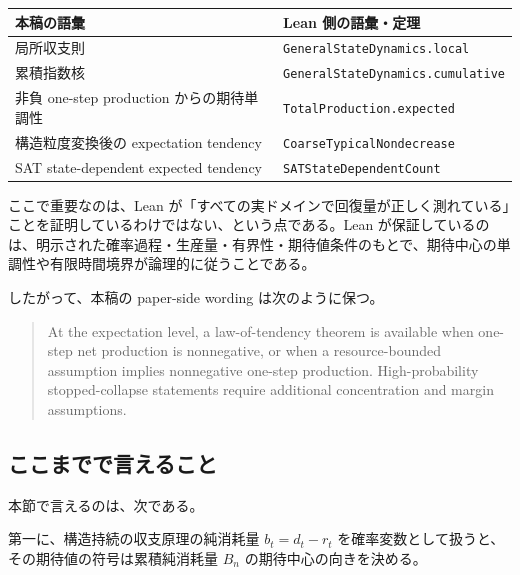 \documentclass[12pt,a4paper]{article}
\begin{document}
{\def\LTcaptype{table} %
\begin{longtable}[]{@{}
  >{\raggedright\arraybackslash}p{}
  >{\raggedright\arraybackslash}p{}@{}}
\toprule\noalign{}
\begin{minipage}[b]{\linewidth}\raggedright
本稿の語彙
\end{minipage} & \begin{minipage}[b]{\linewidth}\raggedright
Lean 側の語彙・定理
\end{minipage} \\
\midrule\noalign{}
\endhead
\bottomrule\noalign{}
\endlastfoot
局所収支則 & \texttt{GeneralStateDynamics.local} \\
累積指数核 & \texttt{GeneralStateDynamics.cumulative} \\
非負 one-step production からの期待単調性 & \texttt{TotalProduction.expected} \\
構造粒度変換後の expectation tendency & \texttt{CoarseTypicalNondecrease} \\
SAT state-dependent expected tendency & \texttt{SATStateDependentCount} \\
\end{longtable}
}

ここで重要なのは、Lean が「すべての実ドメインで回復量が正しく測れている」ことを証明しているわけではない、という点である。Lean が保証しているのは、明示された確率過程・生産量・有界性・期待値条件のもとで、期待中心の単調性や有限時間境界が論理的に従うことである。

したがって、本稿の paper-side wording は次のように保つ。

\begin{quote}
At the expectation level, a law-of-tendency theorem is available when one-step net production is nonnegative, or when a resource-bounded assumption implies nonnegative one-step production. High-probability stopped-collapse statements require additional concentration and margin assumptions.
\end{quote}

\subsection{ここまでで言えること}\label{ux3053ux3053ux307eux3067ux3067ux8a00ux3048ux308bux3053ux3068}

本節で言えるのは、次である。

第一に、構造持続の収支原理の純消耗量 \(b_{t}=d_{t}-r_{t}\) を確率変数として扱うと、その期待値の符号は累積純消耗量 \(B_{n}\) の期待中心の向きを決める。
\end{document}

